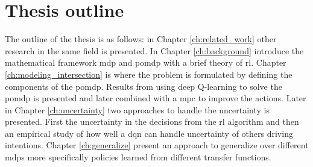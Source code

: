 \section{Thesis outline}
The outline of the thesis is as follows: in Chapter \ref{ch:related_work} other research in the same field is presented. In Chapter \ref{ch:background} introduce the mathematical framework \gls{mdp} and \gls{pomdp} with a brief theory of \gls{rl}. 
Chapter \ref{ch:modeling_intersection} is where the problem is formulated by defining the components of the \gls{pomdp}. Results from using deep Q-learning to solve the \gls{pomdp} is presented and later combined with a \gls{mpc} to improve the actions. Later in Chapter \ref{ch:uncertainty} two approaches to handle the uncertainty is presented. First the uncertainty in the decisions from the \gls{rl} algorithm and then an empirical study of how well a \gls{dqn} can handle uncertainty of others driving intentions. Chapter \ref{ch:generalize} present an approach to generalize over different \gls{mdp}s more specifically policies learned from different transfer functions. 


